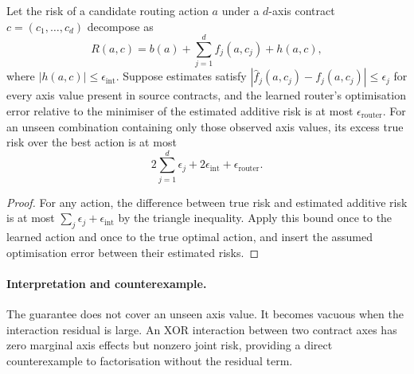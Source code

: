 \begin{theorem}
Let the risk of a candidate routing action $a$ under a $d$-axis contract
$c=(c_1,\ldots,c_d)$ decompose as
\[
 R(a,c)=b(a)+\sum_{j=1}^d f_j(a,c_j)+h(a,c),
\]
where $|h(a,c)|\leq\epsilon_{\mathrm{int}}$. Suppose estimates satisfy
$|\widehat f_j(a,c_j)-f_j(a,c_j)|\leq\epsilon_j$ for every axis value present
in source contracts, and the learned router's optimisation error relative to
the minimiser of the estimated additive risk is at most
$\epsilon_{\mathrm{router}}$. For an unseen combination containing only those
observed axis values, its excess true risk over the best action is at most
\[
 2\sum_{j=1}^d\epsilon_j+
 2\epsilon_{\mathrm{int}}+\epsilon_{\mathrm{router}}.
\]
\end{theorem}

\begin{proof}
For any action, the difference between true risk and estimated additive risk is
at most $\sum_j\epsilon_j+\epsilon_{\mathrm{int}}$ by the triangle
inequality. Apply this bound once to the learned action and once to the true
optimal action, and insert the assumed optimisation error between their
estimated risks.
\end{proof}

\paragraph{Interpretation and counterexample.}
The guarantee does not cover an unseen axis value. It becomes vacuous when the
interaction residual is large. An XOR interaction between two contract axes
has zero marginal axis effects but nonzero joint risk, providing a direct
counterexample to factorisation without the residual term.
